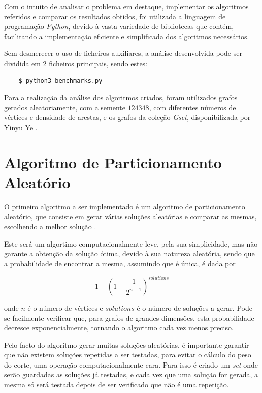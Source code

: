 \documentclass[mirror, portugues]{revdetua}
\begin{document}
Com o intuito de analisar o problema em destaque, implementar os algoritmos referidos e comparar os resultados obtidos, foi utilizada a linguagem de programação \textit{Python}, devido à vasta variedade de bibliotecas que contém, facilitando a implementação eficiente e simplificada dos algoritmos necessários.

Sem desmerecer o uso de ficheiros auxiliares, a análise desenvolvida pode ser dividida em 2 ficheiros principais, sendo estes:
\begin{verbatim}
    $ python3 benchmarks.py
\end{verbatim}

Para a realização da análise dos algoritmos criados, foram utilizados grafos gerados aleatoriamente, com a semente $124348$, com diferentes números de vértices e densidade de arestas, e os grafos da coleção \textit{Gset}, disponibilizada por Yinyu Ye \cite{GS24}.

\section{Algoritmo de Particionamento Aleatório}

O primeiro algoritmo a ser implementado é um algoritmo de particionamento aleatório, que consiste em gerar várias soluções aleatórias e comparar as mesmas, escolhendo a melhor solução \cite{AG14}.

Este será um algortimo computacionalmente leve, pela sua simplicidade, mas não garante a obtenção da solução ótima, devido à sua natureza aleatória, sendo que a probabilidade de encontrar a mesma, assumindo que é única, é dada por

$$1 - \left( 1 - \frac{1}{2^{n-1}} \right)^{solutions}$$

\noindent onde $n$ é o número de vértices e $solutions$ é o número de soluções a gerar. Pode-se facilmente verificar que, para grafos de grandes dimensões, esta probabilidade decresce exponencialmente, tornando o algoritmo cada vez menos preciso.

Pelo facto do algoritmo gerar muitas soluções aleatórias, é importante garantir que não existem soluções repetidas a ser testadas, para evitar o cálculo do peso do corte, uma operação computacionalmente cara. Para isso é criado um \textit{set} onde serão guardadas as soluções já testadas, e cada vez que uma solução for gerada, a mesma só será testada depois de ser verificado que não é uma repetição. 
\end{document}
